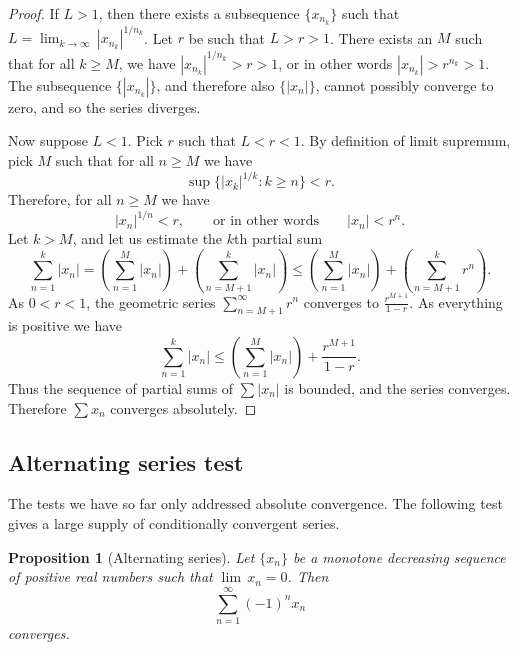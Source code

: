 \documentclass[12pt]{book}
\newcommand{\abs}[1]{\left\lvert {#1} \right\rvert}
\theoremstyle{plain}
\newtheorem{prop}[thm]{Proposition}
\theoremstyle{remark}
\theoremstyle{definition}
\theoremstyle{exercise}
\theoremstyle{example}
\begin{document}
\begin{proof}
If $L > 1$, then there exists a subsequence $\{ x_{n_k} \}$ such that
$L = \lim_{k\to\infty} \, {\abs{x_{n_k}}}^{1/n_k}$.  Let
$r$ be such that $L > r > 1$.  There exists an $M$ such
that for all $k \geq M$, we have 
${\abs{x_{n_k}}}^{1/n_k} > r > 1$, or in other words
$\abs{x_{n_k}} > r^{n_k} > 1$.  The
subsequence 
$\{ \abs{x_{n_k}} \}$, and therefore also
$\{ \abs{x_{n}} \}$, cannot possibly converge to zero, and so the series
diverges.

Now suppose $L < 1$.  Pick $r$ such that $L < r < 1$.
By definition of limit supremum,
pick $M$ such that for all $n \geq M$ we have 
\begin{equation*}
\sup \{ {\abs{x_k}}^{1/k} : k \geq n \} < r .
\end{equation*}
Therefore, for all $n \geq M$ we have
\begin{equation*}
{\abs{x_n}}^{1/n} < r , \qquad \text{or in other words} \qquad \abs{x_n} < r^n .
\end{equation*}
Let $k > M$, and let us estimate the $k$th partial sum
\begin{equation*}
\sum_{n=1}^k \abs{x_n} = 
\left( \sum_{n=1}^M \abs{x_n} \right) + 
\left( \sum_{n=M+1}^k \abs{x_n} \right)
\leq
\left( \sum_{n=1}^M \abs{x_n} \right) + 
\left( \sum_{n=M+1}^k r^n \right) .
\end{equation*}
As $0 < r < 1$,
the geometric series $\sum_{n=M+1}^\infty r^n$ converges to
$\frac{r^{M+1}}{1-r}$.  As everything is positive we have
\begin{equation*}
\sum_{n=1}^k \abs{x_n} 
\leq
\left( \sum_{n=1}^M \abs{x_n} \right) + 
\frac{r^{M+1}}{1-r} .
\end{equation*}
Thus the sequence of partial sums of $\sum \abs{x_n}$ is bounded, and
the series converges.  Therefore $\sum x_n$ converges absolutely.
\end{proof}

\subsection{Alternating series test}

The tests we have so far only addressed absolute convergence.  The
following test gives a large supply of conditionally convergent series.

\begin{prop}[Alternating series]
Let $\{ x_n \}$ be a monotone decreasing sequence of positive real numbers such
that $\lim\, x_n = 0$.  Then
\begin{equation*}
\sum_{n=1}^\infty {(-1)}^n x_n
\end{equation*}
converges.
\end{prop}
\end{document}
